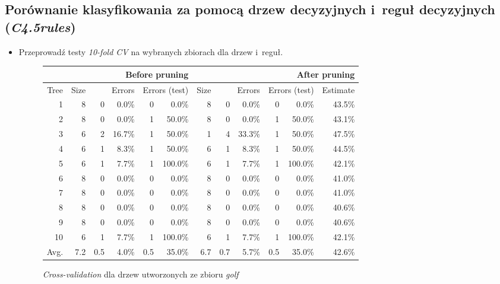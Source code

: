 \documentclass{article}
\begin{document}
\subsection{Porównanie klasyfikowania za pomocą drzew decyzyjnych i~reguł decyzyjnych (\emph{C4.5rules})}

\begin{itemize}
\item Przeprowadź testy \emph{10-fold CV} na wybranych zbiorach dla drzew i~reguł.

\begin{figure}
\begin{tabular}{|r||r|rr|rr||r|rr|rr|r|}
\hline
&\multicolumn{5}{1||}{Before pruning}&\multicolumn{6}{1|}{After pruning} \\
\hline
Tree & 
Size & 
\multicolumn{2}{1|}{Errors} & 
\multicolumn{2}{1||}{Errors (test)} & 
Size & 
\multicolumn{2}{1|}{Errors} & 
\multicolumn{2}{1|}{Errors (test)} & 
Estimate \\
\hline\hline
    1 &    8 &    0 &  0.0\% &    0 &   0.0\% &    8 &    0 &  0.0\% &    0 &   0.0\% &  43.5\%  \\
    2 &    8 &    0 &  0.0\% &    1 &  50.0\% &    8 &    0 &  0.0\% &    1 &  50.0\% &  43.1\%  \\
    3 &    6 &    2 & 16.7\% &    1 &  50.0\% &    1 &    4 & 33.3\% &    1 &  50.0\% &  47.5\%  \\
    4 &    6 &    1 &  8.3\% &    1 &  50.0\% &    6 &    1 &  8.3\% &    1 &  50.0\% &  44.5\%  \\
    5 &    6 &    1 &  7.7\% &    1 & 100.0\% &    6 &    1 &  7.7\% &    1 & 100.0\% &  42.1\%  \\
    6 &    8 &    0 &  0.0\% &    0 &   0.0\% &    8 &    0 &  0.0\% &    0 &   0.0\% &  41.0\%  \\
    7 &    8 &    0 &  0.0\% &    0 &   0.0\% &    8 &    0 &  0.0\% &    0 &   0.0\% &  41.0\%  \\
    8 &    8 &    0 &  0.0\% &    0 &   0.0\% &    8 &    0 &  0.0\% &    0 &   0.0\% &  40.6\%  \\
    9 &    8 &    0 &  0.0\% &    0 &   0.0\% &    8 &    0 &  0.0\% &    0 &   0.0\% &  40.6\%  \\
   10 &    6 &    1 &  7.7\% &    1 & 100.0\% &    6 &    1 &  7.7\% &    1 & 100.0\% &  42.1\%  \\
\hline\hline
 Avg. &  7.2 &  0.5 &  4.0\% &  0.5 &  35.0\% &  6.7 &  0.7 &  5.7\% &  0.5 &  35.0\% &  42.6\%  \\
\hline
\end{tabular}
\caption{\emph{Cross-validation} dla drzew utworzonych ze zbioru \emph{golf}}
\label{p2t2-golf-trees-cv}
\end{figure}


\end{itemize}
\end{document}
